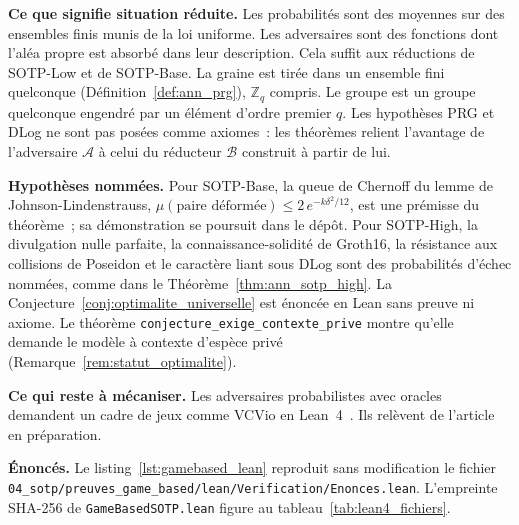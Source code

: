 \begin{sloppypar}
\noindent\textbf{Ce que signifie \og situation r\'eduite\fg.} Les probabilit\'es sont des
moyennes sur des ensembles finis munis de la loi uniforme. Les adversaires sont des
fonctions dont l'al\'ea propre est absorb\'e dans leur description. Cela suffit aux
r\'eductions de SOTP-Low et de SOTP-Base. La graine est tir\'ee dans un ensemble fini
quelconque (D\'efinition~\ref{def:ann_prg}), $\mathbb{Z}_q$ compris. Le groupe est un groupe
quelconque engendr\'e par un \'el\'ement d'ordre premier $q$. Les hypoth\`eses PRG et DLog ne
sont pas pos\'ees comme axiomes~: les th\'eor\`emes relient l'avantage de l'adversaire
$\mathcal{A}$ \`a celui du r\'educteur $\mathcal{B}$ construit \`a partir de lui.

\medskip
\noindent\textbf{Hypoth\`eses nomm\'ees.} Pour SOTP-Base, la queue de Chernoff du lemme de
Johnson-Lindenstrauss, $\mu(\text{paire d\'eform\'ee}) \leq 2\,e^{-k\delta^2/12}$, est une
pr\'emisse du th\'eor\`eme~; sa d\'emonstration se poursuit dans le d\'ep\^ot. Pour SOTP-High, la
divulgation nulle parfaite, la connaissance-solidit\'e de Groth16, la r\'esistance aux collisions
de Poseidon et le caract\`ere liant sous DLog sont des probabilit\'es d'\'echec nomm\'ees, comme
dans le Th\'eor\`eme~\ref{thm:ann_sotp_high}. La Conjecture~\ref{conj:optimalite_universelle}
est \'enonc\'ee en Lean sans preuve ni axiome. Le th\'eor\`eme
\texttt{conjecture\_exige\_contexte\_prive} montre qu'elle demande le mod\`ele \`a contexte
d'esp\`ece priv\'e (Remarque~\ref{rem:statut_optimalite}).

\medskip
\noindent\textbf{Ce qui reste \`a m\'ecaniser.} Les adversaires probabilistes avec oracles
demandent un cadre de jeux comme VCVio en Lean~4~\cite{VCVio2026}. Ils rel\`event de
l'article en pr\'eparation.

\medskip
\noindent\textbf{\'Enonc\'es.} Le listing~\ref{lst:gamebased_lean} reproduit sans modification
le fichier \texttt{04\_sotp/preuves\_game\_based/lean/Verification/Enonces.lean}. L'empreinte
SHA-256 de \texttt{GameBasedSOTP.lean} figure au tableau~\ref{tab:lean4_fichiers}.
\end{sloppypar}



